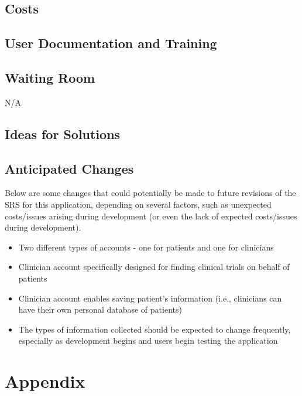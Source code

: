 \documentclass[12pt, titlepage]{article}
\begin{document}
\subsection{Costs}

\subsection{User Documentation and Training}

\subsection{Waiting Room}

N/A

\subsection{Ideas for Solutions}

\subsection{Anticipated Changes}

Below are some changes that could potentially be made to future 
revisions of the SRS for this application, depending on several factors,
such as unexpected costs/issues arising during development (or even the lack 
of expected costs/issues during development).

\begin{itemize}
    \item Two different types of accounts - one for patients and one for clinicians
    \item Clinician account specifically designed for finding clinical trials on behalf of patients
    \item Clinician account enables saving patient's information (i.e., clinicians can have their own personal database of patients)
    \item The types of information collected should be expected to change frequently, especially as development begins and users begin testing the application
\end{itemize}





\newpage

\section{Appendix}
\end{document}
